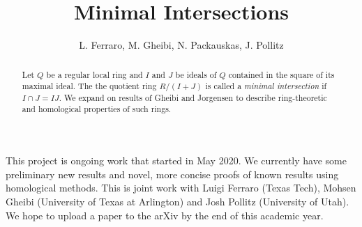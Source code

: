 \documentclass{amsart}
\theoremstyle{definition}
\theoremstyle{remark}
\numberwithin{equation}{section}
\begin{document}
\title{Minimal Intersections}
\author{L. Ferraro, M. Gheibi, N. Packauskas, J. Pollitz}


\begin{abstract}
	Let $Q$ be a regular local ring and $I$ and $J$ be ideals of $Q$ contained in the square of its maximal ideal. The the quotient ring $R/(I+J)$ is called a \textit{minimal intersection} if $I \cap J = IJ$. We expand on results of Gheibi and Jorgensen to describe ring-theoretic and homological properties of such rings. 
\end{abstract}


\maketitle

This project is ongoing work that started in May 2020. We currently have some preliminary new results and novel, more concise proofs of known results using homological methods.  This is joint work with Luigi Ferraro (Texas Tech), Mohsen Gheibi (University of Texas at Arlington) and Josh Pollitz (University of Utah).  We hope to upload a paper to the arXiv by the end of this academic year. 
\end{document}
